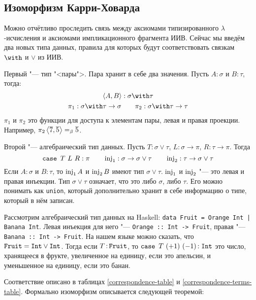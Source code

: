 \subsection{\texorpdfstring{Изоморфизм Карри-Ховарда}{Curry-Howard correspondence}}

Можно отчётливо проследить связь между аксиомами типизированного $\lambda$-исчисления и аксиомами импликационного фрагмента ИИВ.
Сейчас мы введём два новых типа данных, правила для которых будут соответствовать связкам $\with$ и $\lor$ из ИИВ.

Первый "--- тип "<пары">. Пара хранит в себе два значения. Пусть $A : \sigma$ и $B : \tau$, тогда:
\begin{gather*}
    \pair{A,B} : \sigma \with \tau \\
    \pi_1 : \sigma\with\tau\to\sigma \qquad \pi_2 : \sigma\with\tau\to\tau
\end{gather*}
$\pi_1$ и $\pi_2$ это функции для доступа к элементам пары, левая и правая проекции.
Например, $\pi_2 \left<\overline 7,\overline 5\right> =_\beta \overline 5$.

Второй "--- алгебраический тип данных. Пусть $T : \sigma\vee\tau$, $L : \sigma\to\pi$, $R : \tau\to\pi$. Тогда
\[
    \mathinner{\mathtt{case}}~T~L~R : \pi \qquad \operatorname{inj}_1 : \sigma\to\sigma\vee\tau \qquad \operatorname{inj}_2 : \tau\to\sigma\vee\tau
\]
Если $A : \sigma$ и $B : \tau$, то $\operatorname{inj}_1 A$ и $\operatorname{inj}_2 B$ имеют тип $\sigma\vee\tau$.
$\operatorname{inj}_1$ и $\operatorname{inj}_2$ "--- это левая и правая инъекции.
Тип $\sigma \vee \tau$ означает, что это либо $\sigma$, либо $\tau$.
Его можно понимать как \texttt{union}, который дополнительно хранит в себе информацию о типе, который в нём записан.

Рассмотрим алгебраический тип данных на Haskell: \texttt{data Fruit = Orange Int | Banana Int}. Левая инъекция для него "---
\texttt{Orange :: Int -> Fruit}, правая "--- \texttt{Banana :: Int -> Fruit}.
На нашем языке можно сказать, что $\mathinner\mathtt{Fruit} = \mathinner{\mathtt{Int}} \vee \mathinner{\mathtt{Int}}$.
Тогда если $T \mathinner{:} \mathtt{Fruit}$, то $\mathinner{\mathtt{case}}~T~(+1)~(-1) \mathinner{:} \mathrel{\mathtt{Int}}$ это число,
хранящееся в фрукте, увеличенное на единицу, если это апельсин, и уменьшенное на единицу, если это банан.

Соответствие описано в таблицах \ref{correspondence-table} и \ref{correspondence-terms-table}.
Формально изоморфизм описывается следующей теоремой:

